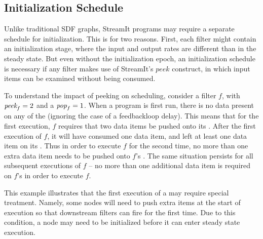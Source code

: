 \documentclass{sig-alt-full}
\begin{document}
\subsection{Initialization Schedule}
\label{sec:init-peeking}

Unlike traditional SDF graphs, StreamIt programs may require a
separate schedule for initialization.  This is for two reasons.
First, each filter might contain an initialization stage, where the
input and output rates are different than in the steady state.  But
even without the initialization epoch, an initialization schedule is
necessary if any filter makes use of StreamIt's $peek$ construct, in
which input items can be examined without being consumed.

To understand the impact of peeking on scheduling, consider a filter
$f$, with $\mbox{\it peek}_f = 2$ and a $\mbox{\it pop}_f = 1$. When a {\StreamIt}
program is first run, there is no data present on any of the
{\Channels} (ignoring the case of a feedbackloop delay).  This means
that for the first execution, {\filter} $f$ requires that two data
items be pushed onto its {\Input} {\Channel}.  After the first
execution of $f$, it will have consumed one data item, and left at
least one data item on its {\Input} {\Channel}.  Thus in order to
execute $f$ for the second time, no more than one extra data item
needs to be pushed onto $f$'s {\Input} {\Channel}.  The same situation
persists for all subsequent executions of $f$ -- no more than one
additional data item is required on $f$'s {\Input} {\Channel} in order
to execute $f$.

This example illustrates that the first execution of a {\filter} may
require special treatment.  Namely, some nodes will need to push extra
items at the start of execution so that downstream filters can fire
for the first time.  Due to this condition, a {\StreamIt} node may
need to be initialized before it can enter steady state execution.


\end{document}
